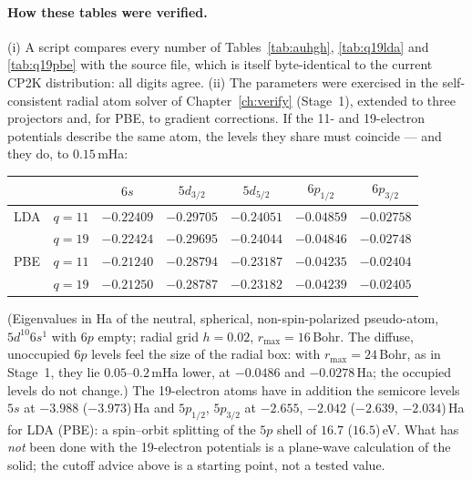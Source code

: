 \paragraph{How these tables were verified.} (i) A script compares every
number of Tables~\ref{tab:auhgh}, \ref{tab:q19lda} and \ref{tab:q19pbe}
with the source file, which is itself byte-identical to the current CP2K
distribution: all digits agree. (ii) The parameters were exercised in the
self-consistent radial atom solver of Chapter~\ref{ch:verify} (Stage~1),
extended to three projectors and, for PBE, to gradient corrections. If
the 11- and 19-electron potentials describe the same atom, the levels
they share must coincide --- and they do, to $0.15$\,mHa:
\begin{center}\small
\begin{tabular}{@{}llccccc@{}}
\toprule
 & & $6s$ & $5d_{3/2}$ & $5d_{5/2}$ & $6p_{1/2}$ & $6p_{3/2}$\\
\midrule
LDA & $q=11$ & $-0.22409$ & $-0.29705$ & $-0.24051$ & $-0.04859$ & $-0.02758$\\
    & $q=19$ & $-0.22424$ & $-0.29695$ & $-0.24044$ & $-0.04846$ & $-0.02748$\\
PBE & $q=11$ & $-0.21240$ & $-0.28794$ & $-0.23187$ & $-0.04235$ & $-0.02404$\\
    & $q=19$ & $-0.21250$ & $-0.28787$ & $-0.23182$ & $-0.04239$ & $-0.02405$\\
\bottomrule
\end{tabular}
\end{center}
(Eigenvalues in Ha of the neutral, spherical, non-spin-polarized
pseudo-atom, $5d^{10}6s^1$ with $6p$ empty; radial grid $h = 0.02$,
$r_{\max} = 16$\,Bohr. The diffuse, unoccupied $6p$ levels feel the size of
the radial box: with $r_{\max} = 24$\,Bohr, as in Stage~1, they lie
$0.05$--$0.2$\,mHa lower, at $-0.0486$ and $-0.0278$\,Ha; the occupied
levels do not change.) The 19-electron atoms have in addition the
semicore levels $5s$ at $-3.988$ ($-3.973$)\,Ha and $5p_{1/2}$,
$5p_{3/2}$ at $-2.655$, $-2.042$ ($-2.639$, $-2.034$)\,Ha for LDA (PBE):
a spin--orbit splitting of the $5p$ shell of $16.7$ ($16.5$)\,eV. What
has \emph{not} been done with the 19-electron potentials is a
plane-wave calculation of the solid; the cutoff advice above is a
starting point, not a tested value.
